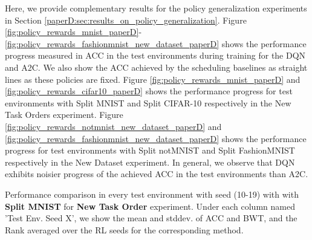 Here, we provide complementary results for the policy generalization experiments in Section \ref{paperD:sec:results_on_policy_generalization}. Figure \ref{fig:policy_rewards_mnist_paperD}-\ref{fig:policy_rewards_fashionmnist_new_dataset_paperD} shows the performance progress measured in ACC in the test environments during training for the DQN and A2C. We also show the ACC achieved by the scheduling baselines as straight lines as these policies are fixed. Figure \ref{fig:policy_rewards_mnist_paperD} and \ref{fig:policy_rewards_cifar10_paperD} shows the performance progress for test environments with Split MNIST and Split CIFAR-10 respectively in the New Task Orders experiment. Figure \ref{fig:policy_rewards_notmnist_new_dataset_paperD} and \ref{fig:policy_rewards_fashionmnist_new_dataset_paperD} shows the performance progress for test environments with Split notMNIST and Split FashionMNIST respectively in the New Dataset experiment. In general, we observe that DQN exhibits noisier progress of the achieved ACC in the test environments than A2C. 






\begin{table}[t]
	\centering
	\caption{Performance comparison in every test environment with seed (10-19) with with {\bf Split MNIST} for \textbf{New Task Order} experiment. Under each column named 'Test Env. Seed X', we show the mean and stddev. of ACC and BWT, and the Rank averaged over the RL seeds for the corresponding method. 
	}
	\vspace{-3mm}
	\resizebox{0.85\textwidth}{!}{
		
	}
	\label{tab:environment_results_new_task_order_mnist}
\end{table}

